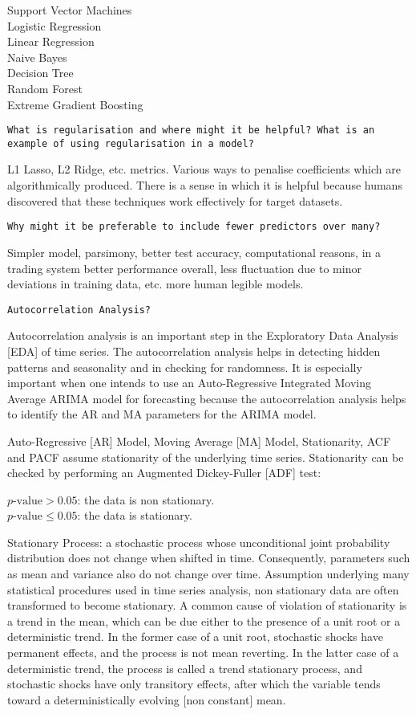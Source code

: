Support Vector Machines \\
Logistic Regression \\
Linear Regression \\
Naive Bayes \\
Decision Tree \\
Random Forest \\
Extreme Gradient Boosting

\texttt{What is regularisation and where might it be helpful? What is an example of using regularisation in a model?}

L1 Lasso, L2 Ridge, etc. metrics. Various ways to penalise coefficients which are algorithmically produced. There is a sense in which it is helpful because humans discovered that these techniques work effectively for target datasets.

\texttt{Why might it be preferable to include fewer predictors over many?}

Simpler model, parsimony, better test accuracy, computational reasons, in a trading system better performance overall, less fluctuation due to minor deviations in training data, etc. more human legible models.

\texttt{Autocorrelation Analysis?}

Autocorrelation analysis is an important step in the Exploratory Data Analysis [EDA] of time series. The autocorrelation analysis helps in detecting hidden patterns and seasonality and in checking for randomness. It is especially important when one intends to use an Auto-Regressive Integrated Moving Average ARIMA model for forecasting because the autocorrelation analysis helps to identify the AR and MA parameters for the ARIMA model.

Auto-Regressive [AR] Model, Moving Average [MA] Model, Stationarity, ACF and PACF assume stationarity of the underlying time series. Stationarity can be checked by performing an Augmented Dickey-Fuller [ADF] test:

$p\text{-value} > 0.05$: the data is non stationary. \\
$p\text{-value} \le 0.05$: the data is stationary.

Stationary Process: a stochastic process whose unconditional joint probability distribution does not change when shifted in time. Consequently, parameters such as mean and variance also do not change over time. Assumption underlying many statistical procedures used in time series analysis, non stationary data are often transformed to become stationary. A common cause of violation of stationarity is a trend in the mean, which can be due either to the presence of a unit root or a deterministic trend. In the former case of a unit root, stochastic shocks have permanent effects, and the process is not mean reverting. In the latter case of a deterministic trend, the process is called a trend stationary process, and stochastic shocks have only transitory effects, after which the variable tends toward a deterministically evolving [non constant] mean.

